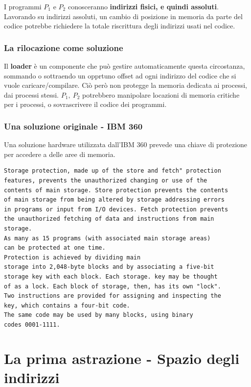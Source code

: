\documentclass{report}
\begin{document}
I programmi $P_1$ e $P_2$ conosceranno \textbf{indirizzi fisici, e quindi assoluti}. Lavorando su indirizzi assoluti, un cambio di posizione in memoria da parte del codice potrebbe richiedere la totale riscrittura degli indirizzi usati nel codice.

\subsubsection{La rilocazione come soluzione}
Il \textbf{loader} è un componente che può gestire automaticamente questa circostanza, sommando o sottraendo un opprtuno offset ad ogni indirizzo del codice che si vuole caricare/compilare. Ciò però non protegge la memoria dedicata ai processi, dai processi stessi. $P_1, \ P_2$ potrebbero manipolare locazioni di memoria critiche per i processi, o sovrascrivere il codice dei programmi.

\subsubsection{Una soluzione originale - IBM 360}
Una soluzione hardware utilizzata dall'IBM 360 prevede una chiave di protezione per accedere a delle aree di memoria.

\begin{verbatim}
Storage protection, made up of the store and fetch" protection 
features, prevents the unauthorized changing or use of the 
contents of main storage. Store protection prevents the contents 
of main storage from being altered by storage addressing errors 
in programs or input from I/O devices. Fetch protection prevents 
the unauthorized fetching of data and instructions from main 
storage. 
As many as 15 programs (with associated main storage areas) 
can be protected at one time. 
Protection is achieved by dividing main 
storage into 2,048-byte blocks and by associating a five-bit 
storage key with each block. Each storage. key may be thought 
of as a lock. Each block of storage, then, has its own "lock". 
Two instructions are provided for assigning and inspecting the 
key, which contains a four-bit code. 
The same code may be used by many blocks, using binary 
codes 0001-1111.
\end{verbatim}

\newpage

\section{La prima astrazione - Spazio degli indirizzi}
\end{document}
